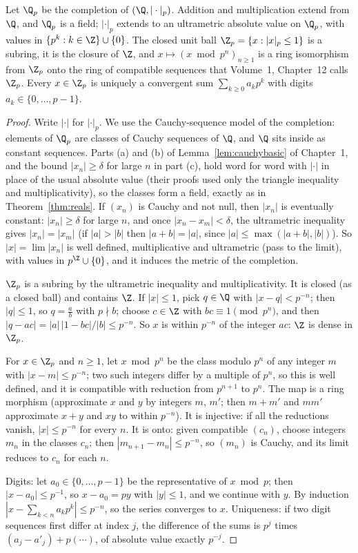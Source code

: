 \begin{theorem}\label{thm:Qp}
Let $\Q_p$ be the completion of $(\Q,|\cdot|_p)$. Addition and multiplication extend from $\Q$, and $\Q_p$ is a field; $|\cdot|_p$ extends to an
ultrametric absolute value on $\Q_p$, with values in $\{p^k:k\in\Z\}\cup\{0\}$. The closed unit ball $\Z_p=\{x:|x|_p\le1\}$ is a subring, it is the
closure of $\Z$, and $x\mapsto(x\bmod p^n)_{n\ge1}$ is a ring isomorphism from $\Z_p$ onto the ring of compatible sequences that Volume~1,
Chapter~12 calls $\Z_p$. Every $x\in\Z_p$ is uniquely a convergent sum $\sum_{k\ge0}a_kp^k$ with digits $a_k\in\{0,\dots,p-1\}$.
\end{theorem}
\begin{proof}
Write $|\cdot|$ for $|\cdot|_p$. We use the Cauchy-sequence model of the completion: elements of $\Q_p$ are classes of Cauchy sequences of $\Q$,
and $\Q$ sits inside as constant sequences. Parts (a) and (b) of Lemma~\ref{lem:cauchybasic} of Chapter~1, and the bound $|x_n|\ge\delta$ for large $n$ in part (c),
hold word for word with $|\cdot|$ in place of the usual absolute value (their proofs used only the triangle inequality and
multiplicativity), so the classes form a field, exactly as in Theorem~\ref{thm:reals}. If $(x_n)$ is Cauchy and not null, then $|x_n|$ is eventually constant: $|x_n|\ge\delta$ for large $n$,
and once $|x_n-x_m|<\delta$, the ultrametric inequality gives $|x_n|=|x_m|$ (if $|a|>|b|$ then $|a+b|=|a|$, since $|a|\le\max(|a+b|,|b|)$). So
$|x|=\lim|x_n|$ is well defined, multiplicative and ultrametric (pass to the limit), with values in $p^\Z\cup\{0\}$, and it induces the
metric of the completion.

$\Z_p$ is a subring by the ultrametric inequality and multiplicativity. It is closed (as a closed ball) and contains $\Z$. If
$|x|\le1$, pick $q\in\Q$ with $|x-q|<p^{-n}$; then $|q|\le1$, so $q=\frac ab$ with $p\nmid b$; choose $c\in\Z$ with $bc\equiv1\pmod{p^n}$, and then
$|q-ac|=|a|\,|1-bc|/|b|\le p^{-n}$. So $x$ is within $p^{-n}$ of the integer $ac$: $\Z$ is dense in $\Z_p$.

For $x\in\Z_p$ and $n\ge1$, let $x\bmod p^n$ be the class modulo $p^n$ of any integer $m$ with $|x-m|\le p^{-n}$; two such integers differ by a
multiple of $p^n$, so this is well defined, and it is compatible with reduction from $p^{n+1}$ to $p^n$. The map is a ring morphism
(approximate $x$ and $y$ by integers $m$, $m'$; then $m+m'$ and $mm'$ approximate $x+y$ and $xy$ to within $p^{-n}$). It is injective: if all
the reductions vanish, $|x|\le p^{-n}$ for every $n$. It is onto: given compatible $(c_n)$, choose integers $m_n$ in the classes $c_n$; then
$|m_{n+1}-m_n|\le p^{-n}$, so $(m_n)$ is Cauchy, and its limit reduces to $c_n$ for each $n$.

Digits: let $a_0\in\{0,\dots,p-1\}$ be the representative of $x\bmod p$; then $|x-a_0|\le p^{-1}$, so $x-a_0=py$ with $|y|\le1$, and we continue with $y$. By
induction $|x-\sum_{k<n}a_kp^k|\le p^{-n}$, so the series converges to $x$. Uniqueness: if two digit sequences first differ at index $j$, the
difference of the sums is $p^j$ times $(a_j-a'_j)+p(\cdots)$, of absolute value exactly $p^{-j}$.
\end{proof}

